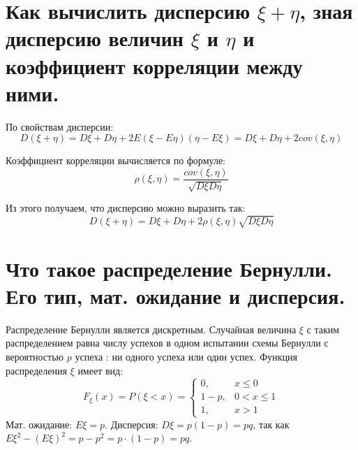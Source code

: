 \section{Как вычислить дисперсию $\xi + \eta$, зная дисперсию величин $\xi$ и $\eta$ и коэффициент корреляции между ними.}

\noindent По свойствам дисперсии:
\[D(\xi+\eta)=D\xi+D\eta + 2E(\xi-E\eta)(\eta-E\xi)= D\xi+D\eta + 2cov(\xi,\eta)\]

\noindent Коэффициент корреляции вычисляется по формуле:
\[\rho(\xi,\eta)=\dfrac{cov(\xi,\eta)}{\sqrt{D\xi D\eta}}\]

\noindent Из этого получаем, что дисперсию можно выразить так:
\[D(\xi+\eta)=D\xi+D\eta + 2\rho(\xi,\eta)\sqrt{D\xi D\eta}\]

\section{Что такое распределение Бернулли. Его тип, мат. ожидание и дисперсия.}

Распределение Бернулли является дискретным. Случайная величина $\xi$ с таким распределением равна числу успехов в одном испытании схемы Бернулли с вероятностью $p$ успеха : ни одного успеха или один успех. Функция распределения $\xi$ имеет вид:
\[
F_{\xi} (x) = P (\xi < x) =
\begin{cases}
	0, & x \le 0 \\
	1 - p, & 0 < x \le 1 \\
	1, & x > 1
\end{cases}
\]
Мат. ожидание: $E\xi = p$. Дисперсия: $D\xi = p(1-p) = pq$, так как $E\xi^2 - (E\xi)^2 = p - p^2 = p \cdot (1-p) = pq$.

 
